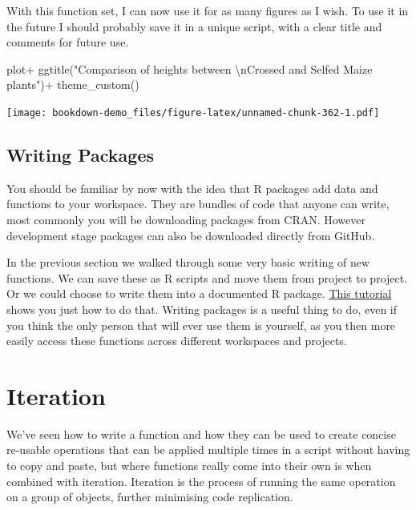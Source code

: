 \documentclass[
]{book}
\newenvironment{Shaded}{\begin{snugshade}}{\end{snugshade}}
\newcommand{\FunctionTok}[1]{\textcolor[rgb]{0.00,0.00,0.00}{#1}}
\newcommand{\NormalTok}[1]{#1}
\newcommand{\SpecialCharTok}[1]{\textcolor[rgb]{0.00,0.00,0.00}{#1}}
\newcommand{\StringTok}[1]{\textcolor[rgb]{0.31,0.60,0.02}{#1}}
\begin{document}
With this function set, I can now use it for as many figures as I wish. To use it in the future I should probably save it in a unique script, with a clear title and comments for future use.

\begin{Shaded}
\begin{Highlighting}[]
\NormalTok{plot}\SpecialCharTok{+}
\FunctionTok{ggtitle}\NormalTok{(}\StringTok{"Comparison of heights between }\SpecialCharTok{\textbackslash{}n}\StringTok{Crossed and Selfed Maize plants"}\NormalTok{)}\SpecialCharTok{+}
\FunctionTok{theme\_custom}\NormalTok{()}
\end{Highlighting}
\end{Shaded}

\texttt{[image: bookdown-demo\_files/figure-latex/unnamed-chunk-362-1.pdf]}

\hypertarget{writing-packages}{%
\subsection{Writing Packages}\label{writing-packages}}

You should be familiar by now with the idea that R packages add data and functions to your workspace. They are bundles of code that anyone can write, most commonly you will be downloading packages from CRAN. However development stage packages can also be downloaded directly from GitHub.

In the previous section we walked through some very basic writing of new functions. We can save these as R scripts and move them from project to project. Or we could choose to write them into a documented R package.
\href{https://ourcodingclub.github.io/tutorials/writing-r-package/}{This tutorial} shows you just how to do that. Writing packages is a useful thing to do, even if you think the only person that will ever use them is yourself, as you then more easily access these functions across different workspaces and projects.

\hypertarget{iteration}{%
\section{Iteration}\label{iteration}}

We've seen how to write a function and how they can be used to create concise re-usable operations that can be applied multiple times in a script without having to copy and paste, but where functions really come into their own is when combined with iteration. Iteration is the process of running the same operation on a group of objects, further minimising code replication.
\end{document}
